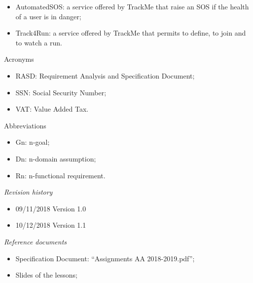 \documentclass{article}
\begin{document}
\begin{legal}
\begin{legal}
\begin{legal}
{\begin{itemize}
				\item AutomatedSOS: a service offered by TrackMe that raise an SOS if the health of a user is in danger;\\
				\item Track4Run: a service offered by TrackMe that permits to define, to join and to watch a run.\\
				\end{itemize}
			}	
			\item Acronyms\\
			{\normalfont	
				\begin{itemize}
				\item RASD: Requirement Analysis and Specification Document;\\
				\item SSN: Social Security Number;\\
				\item VAT: Value Added Tax.\\
				\end{itemize}
			}
			\item Abbreviations\\
			{\normalfont	
				\begin{itemize}
				\item Gn: n-goal;\\
				\item Dn: n-domain assumption;\\
				\item Rn: n-functional requirement.\\
				\end{itemize}
			}
			\end{legal}
		\item \textit{Revision history}\\
		{\normalfont
			\begin{itemize}
			\item 09/11/2018		Version 1.0\\
			\item 10/12/2018		Version 1.1\\
			\end{itemize}
		}
		\item \textit{Reference documents}\\
		{\normalfont	
			\begin{itemize}
			\item Specification Document: “Assignments AA 2018-2019.pdf”;\\
			\item Slides of the lessons;\\

\end{itemize}}
\end{legal}
\end{legal}
\end{document}
